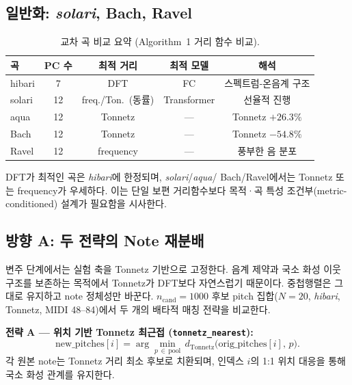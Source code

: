 \documentclass[conference,10pt,a4paper]{IEEEtran}
\begin{document}
\subsection{일반화: \emph{solari}, Bach, Ravel}
\label{subsec:generalization}

\begin{table}[t]
\centering
\caption{교차 곡 비교 요약 (Algorithm~1 거리 함수 비교).}
\label{tab:generalization}
\begin{tabular}{lcccc}
\toprule
곡 & PC 수 & 최적 거리 & 최적 모델 & 해석 \\
\midrule
hibari & 7 & DFT & FC & 스펙트럼-온음계 구조 \\
solari & 12 & freq./Ton.\ (동률) & Transformer & 선율적 진행 \\
aqua   & 12 & Tonnetz & --- & Tonnetz $+26.3\%$ \\
Bach   & 12 & Tonnetz & --- & Tonnetz $-54.8\%$ \\
Ravel  & 12 & frequency & --- & 풍부한 음 분포 \\
\bottomrule
\end{tabular}
\end{table}

DFT가 최적인 곡은 \emph{hibari}에 한정되며, \emph{solari}/\emph{aqua}/
Bach/Ravel에서는 Tonnetz 또는 frequency가 우세하다.
이는 단일 보편 거리함수보다 목적·곡 특성 조건부(metric-conditioned)
설계가 필요함을 시사한다.

\subsection{방향 A: 두 전략의 Note 재분배}
\label{subsec:dirA}

변주 단계에서는 실험 축을 Tonnetz 기반으로 고정한다.
음계 제약과 국소 화성 이웃 구조를 보존하는 목적에서 Tonnetz가 DFT보다
자연스럽기 때문이다. 중첩행렬은 그대로 유지하고 note 정체성만 바꾼다.
$n_{\mathrm{cand}}=1000$ 후보 pitch 집합($N=20$, \emph{hibari},
Tonnetz, MIDI 48--84)에서 두 개의 배타적 매칭 전략을 비교한다.

\textbf{전략 A --- 위치 기반 Tonnetz 최근접
(\texttt{tonnetz\_nearest}):}
\begin{equation}
\mathrm{new\_pitches}[i]
  = \arg\min_{p\,\in\,\mathrm{pool}}\,d_{\mathrm{Tonnetz}}
    \!\bigl(\mathrm{orig\_pitches}[i],\,p\bigr).
\end{equation}
각 원본 note는 Tonnetz 거리 최소 후보로 치환되며,
인덱스 $i$의 1:1 위치 대응을 통해 국소 화성 관계를 유지한다.
\end{document}
